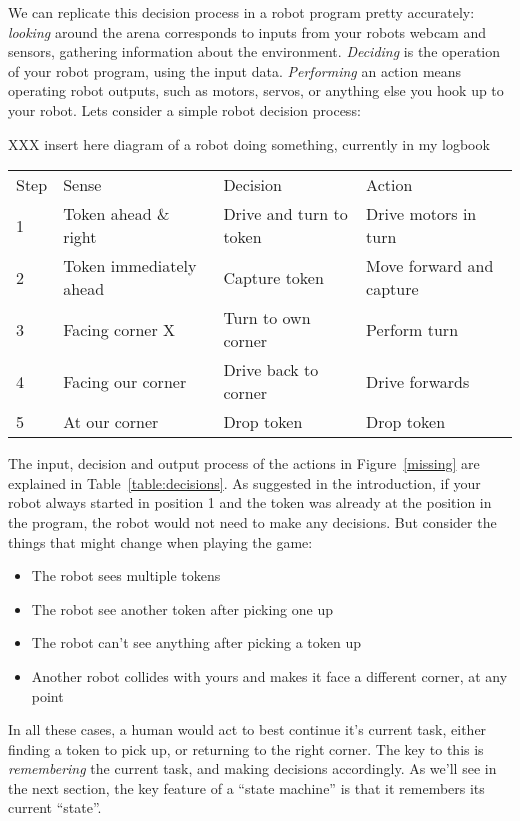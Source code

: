 \documentclass[a4paper,10pt]{article}
\begin{document}
We can replicate this decision process in a robot program pretty accurately:
\textit{looking} around the arena corresponds to inputs from your robots webcam
and sensors, gathering information about the environment. \textit{Deciding} is
the operation of your robot program, using the input data. \textit{Performing}
an action means operating robot outputs, such as motors, servos, or anything
else you hook up to your robot. Lets consider a simple robot decision process:

XXX insert here diagram of a robot doing something, currently in my logbook

\begin{table*}[ht]
\begin{tabular}{|l|l|l|l|}
\hline
Step & Sense & Decision & Action \\
\hhline{|=|=|=|=|}
1 & Token ahead \& right & Drive and turn to token & Drive motors in turn \\
\hline
2 & Token immediately ahead & Capture token & Move forward and capture \\
\hline
3 & Facing corner X & Turn to own corner & Perform turn \\
\hline
4 & Facing our corner & Drive back to corner & Drive forwards \\
\hline
5 & At our corner & Drop token & Drop token \\
\hline
\end{tabular}
\label{table:decisions}
\end{table*}

The input, decision and output process of the actions in Figure~\ref{missing}
are explained in Table~\ref{table:decisions}. As suggested in the introduction,
if your robot always started in position 1 and the token was already at the
position in the program, the robot would not need to make any decisions. But
consider the things that might change when playing the game:

\begin{itemize}
	\item The robot sees multiple tokens
	\item The robot see another token after picking one up
	\item The robot can't see anything after picking a token up
	\item Another robot collides with yours and makes it face a different corner, at any point
\end{itemize}

In all these cases, a human would act to best continue it's current task,
either finding a token to pick up, or returning to the right corner. The key to
this is \textit{remembering} the current task, and making decisions
accordingly. As we'll see in the next section, the key feature of a ``state
machine'' is that it remembers its current ``state''.
\end{document}
